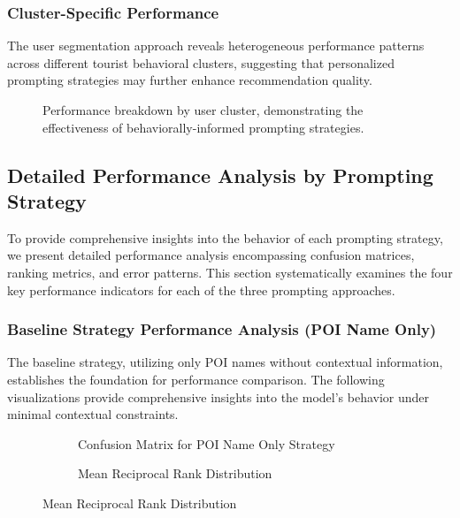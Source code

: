 \documentclass[12pt,a4paper]{article}
\begin{document}
\subsubsection{Cluster-Specific Performance}

The user segmentation approach reveals heterogeneous performance patterns across different tourist behavioral clusters, suggesting that personalized prompting strategies may further enhance recommendation quality.

\begin{figure}[h]
\centering
\caption{Performance breakdown by user cluster, demonstrating the effectiveness of behaviorally-informed prompting strategies.}
\label{fig:cluster_performance}
\end{figure}

\subsection{Detailed Performance Analysis by Prompting Strategy}

To provide comprehensive insights into the behavior of each prompting strategy, we present detailed performance analysis encompassing confusion matrices, ranking metrics, and error patterns. This section systematically examines the four key performance indicators for each of the three prompting approaches.

\subsubsection{Baseline Strategy Performance Analysis (POI Name Only)}

The baseline strategy, utilizing only POI names without contextual information, establishes the foundation for performance comparison. The following visualizations provide comprehensive insights into the model's behavior under minimal contextual constraints.

\begin{figure}[h]
\centering
\begin{subfigure}{0.48\textwidth}
\centering
\caption{Confusion Matrix for POI Name Only Strategy}
\label{fig:baseline_confusion}
\end{subfigure}
\hfill
\begin{subfigure}{0.48\textwidth}
\centering
\caption{Mean Reciprocal Rank Distribution}
\label{fig:baseline_mrr}
\end{subfigure}
\end{figure}
\end{document}
